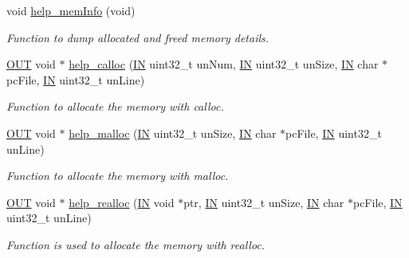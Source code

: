 \begin{DoxyCompactItemize}
\item 
void \hyperlink{group__LIBHELP_ga5023cc64b68b2569abc5b0a576839963}{help\-\_\-mem\-Info} (void)
\begin{DoxyCompactList}\small\item\em Function to dump allocated and freed memory details. \end{DoxyCompactList}\item 
\hyperlink{group__LIBHELP_gaec78e7a9e90a406a56f859ee456e8eae}{O\-U\-T} void $\ast$ \hyperlink{group__LIBHELP_gad69e4cc1b0997b751beff9531e3b858b}{help\-\_\-calloc} (\hyperlink{group__LIBHELP_gac2bbd6d630a06a980d9a92ddb9a49928}{I\-N} uint32\-\_\-t un\-Num, \hyperlink{group__LIBHELP_gac2bbd6d630a06a980d9a92ddb9a49928}{I\-N} uint32\-\_\-t un\-Size, \hyperlink{group__LIBHELP_gac2bbd6d630a06a980d9a92ddb9a49928}{I\-N} char $\ast$pc\-File, \hyperlink{group__LIBHELP_gac2bbd6d630a06a980d9a92ddb9a49928}{I\-N} uint32\-\_\-t un\-Line)
\begin{DoxyCompactList}\small\item\em Function to allocate the memory with calloc. \end{DoxyCompactList}\item 
\hyperlink{group__LIBHELP_gaec78e7a9e90a406a56f859ee456e8eae}{O\-U\-T} void $\ast$ \hyperlink{group__LIBHELP_ga042b2a9f517209fe6c474f02456cab20}{help\-\_\-malloc} (\hyperlink{group__LIBHELP_gac2bbd6d630a06a980d9a92ddb9a49928}{I\-N} uint32\-\_\-t un\-Size, \hyperlink{group__LIBHELP_gac2bbd6d630a06a980d9a92ddb9a49928}{I\-N} char $\ast$pc\-File, \hyperlink{group__LIBHELP_gac2bbd6d630a06a980d9a92ddb9a49928}{I\-N} uint32\-\_\-t un\-Line)
\begin{DoxyCompactList}\small\item\em Function to allocate the memory with malloc. \end{DoxyCompactList}\item 
\hyperlink{group__LIBHELP_gaec78e7a9e90a406a56f859ee456e8eae}{O\-U\-T} void $\ast$ \hyperlink{group__LIBHELP_ga31a678674884400ad5f6b17eda22ee74}{help\-\_\-realloc} (\hyperlink{group__LIBHELP_gac2bbd6d630a06a980d9a92ddb9a49928}{I\-N} void $\ast$ptr, \hyperlink{group__LIBHELP_gac2bbd6d630a06a980d9a92ddb9a49928}{I\-N} uint32\-\_\-t un\-Size, \hyperlink{group__LIBHELP_gac2bbd6d630a06a980d9a92ddb9a49928}{I\-N} char $\ast$pc\-File, \hyperlink{group__LIBHELP_gac2bbd6d630a06a980d9a92ddb9a49928}{I\-N} uint32\-\_\-t un\-Line)
\begin{DoxyCompactList}\small\item\em Function is used to allocate the memory with realloc. \end{DoxyCompactList}\item 

\end{DoxyCompactItemize}
